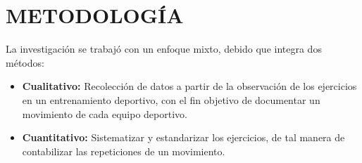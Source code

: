 \chapter{METODOLOG\'IA}
La investigaci\'on se trabaj\'o con un enfoque mixto, debido que integra dos m\'etodos:
\begin{itemize}
	\item \textbf{Cualitativo:} Recolecci\'on de datos a partir de la observaci\'on de los ejercicios en un entrenamiento deportivo, con el fin objetivo de documentar un movimiento de cada equipo deportivo.
	\item \textbf{Cuantitativo:} Sistematizar y estandarizar los ejercicios, de tal manera de contabilizar las repeticiones de un movimiento.
\end{itemize}



